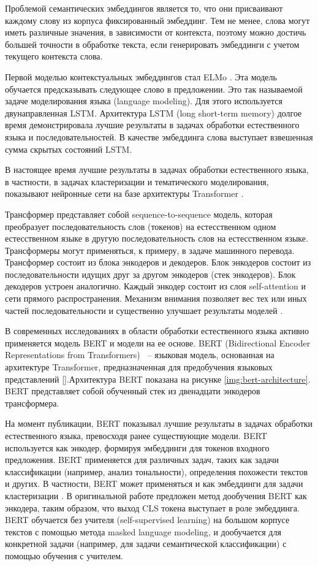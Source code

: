 Проблемой семантических эмбеддингов является то, что они присваивают каждому слову из корпуса фиксированный эмбеддинг. Тем не менее, слова могут иметь различные значения, в зависимости от контекста, поэтому можно достичь большей точности в обработке текста, если генерировать эмбеддинги с учетом текущего контекста слова.

Первой моделью контекстуальных эмбеддингов стал ELMo \cite{elmo}. Эта модель обучается предсказывать следующее слово в предложении. Это так называемой задаче моделирования языка (language modeling). Для этого используется двунаправленная LSTM. Архитектура LSTM (long short-term memory) долгое время демонстрировала лучшие результаты в задачах обработки естественного языка и последовательностей. В качестве эмбеддинга слова выступает взвешенная сумма скрытых состояний LSTM.

В настоящее время лучшие результаты в задачах обработки естественного языка, в частности, в задачах кластеризации и тематического моделирования, показывают нейронные сети на базе архитектуры Transformer \cite{no-patterns}.

Трансформер представляет собой sequence-to-sequence модель, которая преобразует последовательность слов (токенов) на естесственном одном естесственном языке в другую последовательность слов на естесственном языке. Трансформеры могут применяться, к примеру, в задаче машинного перевода. Трансформер состоит из блока энкодеров и декодеров. Блок энкодеров состоит из последовательности идущих друг за другом энкодеров (стек энкодеров). Блок декодеров устроен аналогично. Каждый энкодер состоит из слоя self-attention и сети прямого распространения. Механизм внимания позволяет вес тех или иных частей последовательности и существенно улучшает результаты моделей \cite{transformer}.

В современных исследованиях в области обработки естественного языка активно применяется модель BERT и модели на ее основе. BERT (Bidirectional Encoder Representations from Transformers) ~-- языковая модель, основанная на архитектуре Transformer, предназначенная для предобучения языковых представлений [\cite{bert}].Архитектура BERT показана на рисунке \ref{img:bert-architecture}. BERT представляет собой обученный стек из двенадцати энкодеров трансформера.

На момент публикации, BERT показывал лучшие результаты в задачах обработки естественного языка, превосходя ранее существующие модели. BERT используется как энкодер, формируя эмбеддинги для токенов входного предложения. BERT применяется для различных задач, таких как задачи классификации (например, анализ тональности), определения похожести текстов и других. В частности, BERT может применяться и как эмбеддинги для задачи кластеризации \cite{text-clustering-with-bert}. В оригинальной работе предложен метод дообучения BERT как энкодера, таким образом, что выход CLS токена выступает в роле эмбеддинга. BERT обучается без учителя (self-supervised learning) на большом корпусе текстов с помощью метода masked language modeling, и дообучается для конкретной задачи (например, для задачи семантической классификации) с помощью обучения с учителем.

